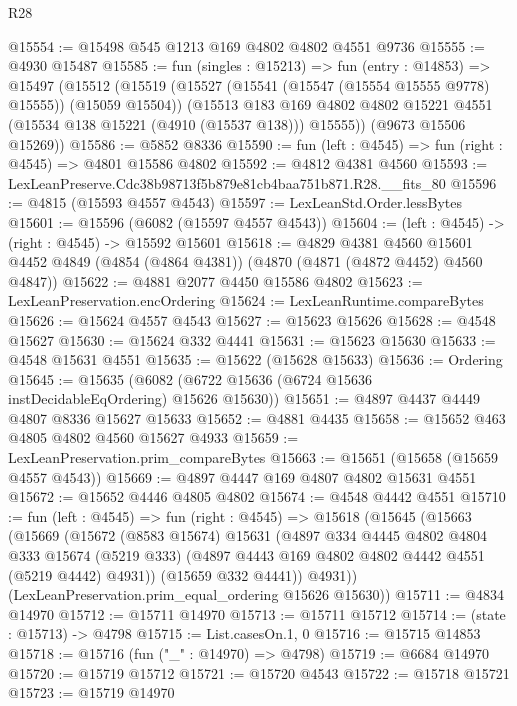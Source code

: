 \begin{lexlean}{R28}
\begin{coremodule}
@15554 := @15498 @545 @1213 @169 @4802 @4802 @4551 @9736
@15555 := @4930 @15487
@15585 := fun (singles : @15213) =>
  fun (entry : @14853) =>
  @15497
    (@15512
      (@15519
        (@15527 (@15541 (@15547 (@15554 @15555 @9778) @15555)) (@15059 @15504))
        (@15513
          @183
          @169
          @4802
          @4802
          @15221
          @4551
          (@15534 @138 @15221 (@4910 (@15537 @138)))
          @15555))
      (@9673 @15506 @15269))
@15586 := @5852 @8336
@15590 := fun (left : @4545) => fun (right : @4545) => @4801 @15586 @4802
@15592 := @4812 @4381 @4560
@15593 := LexLeanPreserve.Cdc38b98713f5b879e81cb4baa751b871.R28.__fits_80
@15596 := @4815 (@15593 @4557 @4543)
@15597 := LexLeanStd.Order.lessBytes
@15601 := @15596 (@6082 (@15597 @4557 @4543))
@15604 := (left : @4545) -> (right : @4545) -> @15592 @15601
@15618 := @4829
    @4381
    @4560
    @15601
    @4452
    @4849
    (@4854 (@4864 @4381))
    (@4870 (@4871 (@4872 @4452) @4560 @4847))
@15622 := @4881 @2077 @4450 @15586 @4802
@15623 := LexLeanPreservation.encOrdering
@15624 := LexLeanRuntime.compareBytes
@15626 := @15624 @4557 @4543
@15627 := @15623 @15626
@15628 := @4548 @15627
@15630 := @15624 @332 @4441
@15631 := @15623 @15630
@15633 := @4548 @15631 @4551
@15635 := @15622 (@15628 @15633)
@15636 := Ordering
@15645 := @15635 (@6082 (@6722 @15636 (@6724 @15636 instDecidableEqOrdering) @15626 @15630))
@15651 := @4897 @4437 @4449 @4807 @8336 @15627 @15633
@15652 := @4881 @4435
@15658 := @15652 @463 @4805 @4802 @4560 @15627 @4933
@15659 := LexLeanPreservation.prim_compareBytes
@15663 := @15651 (@15658 (@15659 @4557 @4543))
@15669 := @4897 @4447 @169 @4807 @4802 @15631 @4551
@15672 := @15652 @4446 @4805 @4802
@15674 := @4548 @4442 @4551
@15710 := fun (left : @4545) =>
  fun (right : @4545) =>
  @15618
    (@15645
      (@15663
        (@15669
          (@15672
            (@8583 @15674)
            @15631
            (@4897
              @334
              @4445
              @4802
              @4804
              @333
              @15674
              (@5219 @333)
              (@4897 @4443 @169 @4802 @4802 @4442 @4551 (@5219 @4442) @4931))
            (@15659 @332 @4441))
          @4931))
      (LexLeanPreservation.prim_equal_ordering @15626 @15630))
@15711 := @4834 @14970
@15712 := @15711 @14970
@15713 := @15711 @15712
@15714 := (state : @15713) -> @4798
@15715 := List.casesOn.{1, 0}
@15716 := @15715 @14853
@15718 := @15716 (fun ("_" : @14970) => @4798)
@15719 := @6684 @14970
@15720 := @15719 @15712
@15721 := @15720 @4543
@15722 := @15718 @15721
@15723 := @15719 @14970

\end{coremodule}
\end{lexlean}
